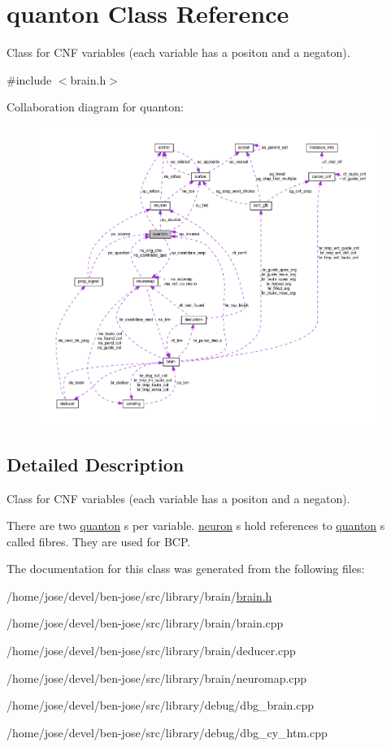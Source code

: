 \hypertarget{classquanton}{\section{quanton Class Reference}
\label{classquanton}
}


Class for C\+N\+F variables (each variable has a positon and a negaton).  




{\ttfamily \#include $<$brain.\+h$>$}



Collaboration diagram for quanton\+:\nopagebreak
\begin{figure}[H]
\begin{center}
\leavevmode
\includegraphics[width=350pt]{df/d7b/classquanton__coll__graph}
\end{center}
\end{figure}


\subsection{Detailed Description}
Class for C\+N\+F variables (each variable has a positon and a negaton). 

There are two \hyperlink{classquanton}{quanton} s per variable. \hyperlink{classneuron}{neuron} s hold references to \hyperlink{classquanton}{quanton} s called fibres. They are used for B\+C\+P. 

The documentation for this class was generated from the following files\+:\begin{DoxyCompactItemize}
\item 
/home/jose/devel/ben-\/jose/src/library/brain/\hyperlink{brain_8h}{brain.\+h}\item 
/home/jose/devel/ben-\/jose/src/library/brain/brain.\+cpp\item 
/home/jose/devel/ben-\/jose/src/library/brain/deducer.\+cpp\item 
/home/jose/devel/ben-\/jose/src/library/brain/neuromap.\+cpp\item 
/home/jose/devel/ben-\/jose/src/library/debug/dbg\+\_\+brain.\+cpp\item 
/home/jose/devel/ben-\/jose/src/library/debug/dbg\+\_\+cy\+\_\+htm.\+cpp\end{DoxyCompactItemize}
